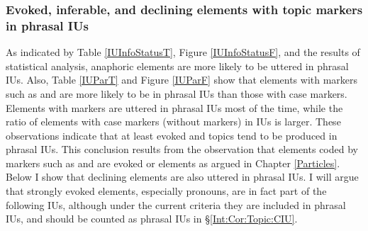 \subsubsection{Evoked, inferable, and declining elements with topic markers in phrasal IUs}\label{Int:Cor:Topic:PIU}

As indicated by Table \ref{IUInfoStatusT}, Figure \ref{IUInfoStatusF}, and the results of statistical analysis,
an\-a\-phor\-ic elements are more likely to be uttered in phrasal IUs.
Also, Table \ref{IUParT} and Figure \ref{IUParF} show that
elements with  markers such as  and  are more likely to be in phrasal IUs than those with case markers.
Elements with  markers are uttered in phrasal IUs most of the time,
while the ratio of elements with case markers (without  markers) in  IUs is larger.
These observations indicate that
at least evoked and  topics tend to be produced in phrasal IUs.
This conclusion results from the observation that
elements coded by  markers such as  and 
are evoked or  elements as argued in Chapter \ref{Particles}.
Below I show that declining elements are also uttered in phrasal IUs.
I will argue that strongly evoked elements, especially pronouns, are in fact part of the following IUs,
although under the current criteria they are included in phrasal IUs,
and should be counted as phrasal IUs in \S \ref{Int:Cor:Topic:CIU}.

